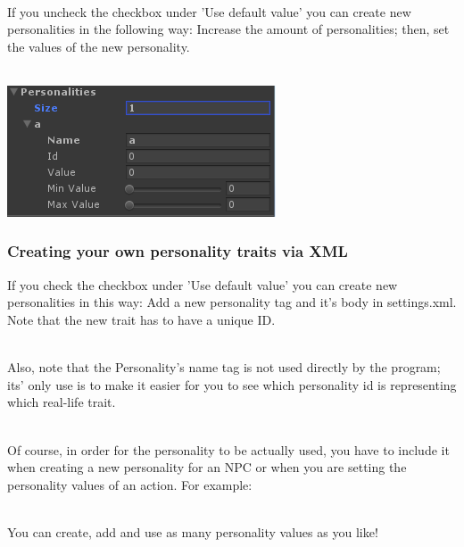 \documentclass[11pt]{article} %
\begin{document}
~\\
If you uncheck the checkbox under 'Use default value' you can create new personalities in the following way:
Increase the amount of personalities; then, set the values of the new personality.

~\\
\includegraphics[]{16}

\subsubsection{Creating your own personality traits via XML}
If you check the checkbox under 'Use default value' you can create new personalities in this way:
Add a new personality tag and it's body in settings.xml. Note that the new trait has to have a unique ID. 

~\\
Also, note that the Personality's name tag is not used directly by the program; its' only use is to make it easier for you to see which personality id is representing which real-life trait.

~\\
Of course, in order for the personality to be actually used, you have to include it when creating a new personality for an NPC or when you are setting the personality values of an action. For example:

\begin{figure}[h]
\end{figure}

~\\
You can create, add and use as many personality values as you like! 
\end{document}

